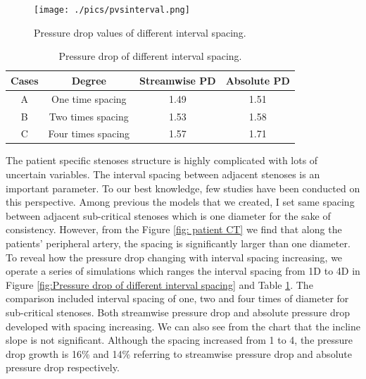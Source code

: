 \begin{figure}[H]
	\centering
	\texttt{[image: ./pics/pvsinterval.png]}
	\caption{Pressure drop values of different interval spacing.}
	\label{fig:Pressure drop values of different interval spacing}
\end{figure}

\begin{table}[h]
	\caption{Pressure drop of different interval spacing.}
	\label{Table: Pressure drop of different interval spacing}
	\vspace{-5pt}
	\begin{center}
		\begin{tabular}{|c|c|c|c|}
			\hline
			\textbf{Cases} &\textbf{Degree} & \textbf{Streamwise PD} & \textbf{Absolute PD}\\
			\hline
			A & One time spacing & 1.49 &1.51\\
			\hline
			B & Two times spacing & 1.53 &1.58\\
			\hline
			C & Four times spacing & 1.57 &1.71\\
			\hline
		\end{tabular}
	\end{center} 
\end{table}


The patient specific stenoses structure is highly complicated with lots of uncertain variables. 
The interval spacing between adjacent stenoses is an important parameter.
To our best knowledge, few studies have been conducted on this perspective.
Among previous the models that we created, I set same spacing between adjacent sub-critical stenoses which is one diameter for the sake of consistency. 
However, from the Figure \ref{fig: patient CT} we find that along the patients' peripheral artery, the spacing is significantly larger than one diameter. 
To reveal how the pressure drop changing with interval spacing increasing, we operate a series of simulations which ranges the interval spacing from 1D to 4D in Figure \ref{fig:Pressure drop of different interval spacing} and Table \ref{Table: Pressure drop of different interval spacing}. 
The comparison included interval spacing of one, two and four times of diameter for sub-critical stenoses.  
Both streamwise pressure drop and absolute pressure drop developed with spacing increasing. 
We can also see from the chart that the incline slope is not significant. 
Although the spacing increased from 1 to 4, the pressure drop growth is 16\% and 14\% referring to streamwise pressure drop and absolute pressure drop respectively.  


